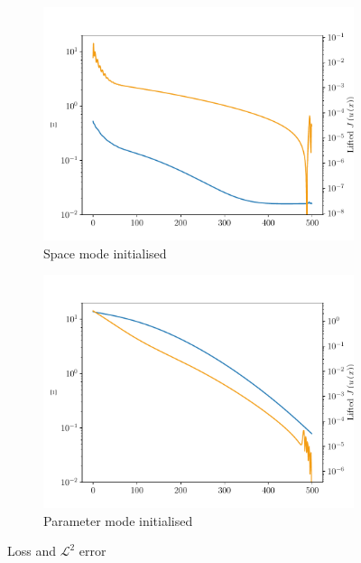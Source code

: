 \begin{figure}
    \begin{subfigure}[t]{0.5\linewidth}
        \centering
        \includegraphics[width=\linewidth]{Figures/ParaError_space_initialised.pdf}
        \caption{Space mode initialised}
    \end{subfigure}
    \begin{subfigure}[t]{0.5\linewidth}
        \centering
        \includegraphics[width=\linewidth]{Figures/ParaError_para_initialised.pdf}
        \caption{Parameter mode initialised}
    \end{subfigure}
        \caption{Loss and $\mathcal{L}^2$ error}
    \label{fig:TransferSpace}
\end{figure}

